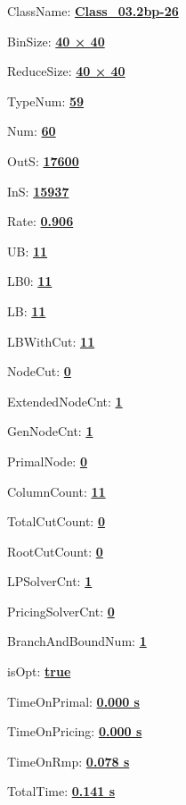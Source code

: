 \documentclass[11pt]{article}
\begin{document}
\pagestyle{empty}


ClassName: \underline{\textbf{Class_03.2bp-26}}
\par
BinSize: \underline{\textbf{40 × 40}}
\par
ReduceSize: \underline{\textbf{40 × 40}}
\par
TypeNum: \underline{\textbf{59}}
\par
Num: \underline{\textbf{60}}
\par
OutS: \underline{\textbf{17600}}
\par
InS: \underline{\textbf{15937}}
\par
Rate: \underline{\textbf{0.906}}
\par
UB: \underline{\textbf{11}}
\par
LB0: \underline{\textbf{11}}
\par
LB: \underline{\textbf{11}}
\par
LBWithCut: \underline{\textbf{11}}
\par
NodeCut: \underline{\textbf{0}}
\par
ExtendedNodeCnt: \underline{\textbf{1}}
\par
GenNodeCnt: \underline{\textbf{1}}
\par
PrimalNode: \underline{\textbf{0}}
\par
ColumnCount: \underline{\textbf{11}}
\par
TotalCutCount: \underline{\textbf{0}}
\par
RootCutCount: \underline{\textbf{0}}
\par
LPSolverCnt: \underline{\textbf{1}}
\par
PricingSolverCnt: \underline{\textbf{0}}
\par
BranchAndBoundNum: \underline{\textbf{1}}
\par
isOpt: \underline{\textbf{true}}
\par
TimeOnPrimal: \underline{\textbf{0.000 s}}
\par
TimeOnPricing: \underline{\textbf{0.000 s}}
\par
TimeOnRmp: \underline{\textbf{0.078 s}}
\par
TotalTime: \underline{\textbf{0.141 s}}
\par
\newpage


\end{document}
